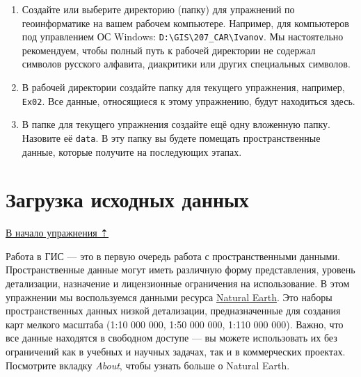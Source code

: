 \documentclass[
  12pt,
]{book}
\begin{document}
\begin{enumerate}
\def\labelenumi{\arabic{enumi}.}
\item
  Создайте или выберите директорию (папку) для упражнений по геоинформатике на вашем рабочем компьютере. Например, для компьютеров под управлением ОС Windows: \texttt{D:\textbackslash{}GIS\textbackslash{}207\_CAR\textbackslash{}Ivanov}. Мы настоятельно рекомендуем, чтобы полный путь к рабочей директории не содержал символов русского алфавита, диакритики или других специальных символов.
\item
  В рабочей директории создайте папку для текущего упражнения, например, \texttt{Ex02}. Все данные, относящиеся к этому упражнению, будут находиться здесь.
\item
  В папке для текущего упражнения создайте ещё одну вложенную папку. Назовите её \texttt{data}. В эту папку вы будете помещать пространственные данные, которые получите на последующих этапах.
\end{enumerate}

\hypertarget{map-design-world-input-data}{%
\section{Загрузка исходных данных}\label{map-design-world-input-data}}

\protect\hyperlink{map-design-world}{В начало упражнения ⇡}

Работа в ГИС --- это в первую очередь работа с пространственными данными. Пространственные данные могут иметь различную форму представления, уровень детализации, назначение и лицензионные ограничения на использование. В этом упражнении мы воспользуемся данными ресурса \href{https://www.naturalearthdata.com/}{Natural Earth}. Это наборы пространственных данных низкой детализации, предназначенные для создания карт мелкого масштаба (1:10 000 000, 1:50 000 000, 1:110 000 000). Важно, что все данные находятся в свободном доступе --- вы можете использовать их без ограничений как в учебных и научных задачах, так и в коммерческих проектах. Посмотрите вкладку \emph{About}, чтобы узнать больше о Natural Earth.
\end{document}
